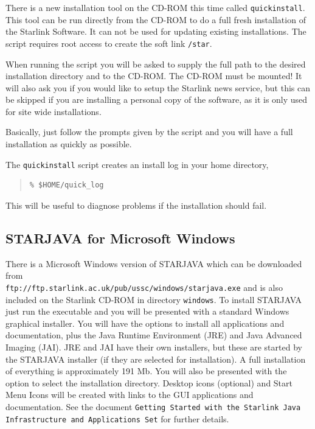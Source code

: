 \documentclass[twoside,11pt]{article}
\newcommand{\htmladdnormallink}[2]{#1}
\newcommand{\xref}[3]{#1}
\newcommand{\xlabel}[1]{}
\renewcommand{\_}{\texttt{\symbol{95}}}
\begin{document}
There is a new installation tool on the CD-ROM this time called \texttt{quick\_install}.
This tool can be run directly from the CD-ROM to do a full fresh installation of
the Starlink Software. It can not be used for updating existing installations.
The script requires root access to create the soft link \texttt{/star}.

When running the script you will be asked to supply the full path to the
desired installation directory and to the CD-ROM. The CD-ROM must be mounted!
It will also ask you if you would like to setup the Starlink news service,
but this can be skipped if you are installing a personal copy of the software,
as it is only used for site wide installations.

Basically, just follow the prompts given by the script and you will have a
full installation as quickly as possible.

The \texttt{quick\_install} script creates an install log in your home directory,

\begin{quote}
\begin{verbatim}
% $HOME/quick_log
\end{verbatim}
\end{quote}

This will be useful to diagnose problems if the installation should fail.

\subsection{\label{windows}\xlabel{windows}STARJAVA for Microsoft Windows}

There is a Microsoft Windows version of STARJAVA which can be downloaded from \\
\htmladdnormallink{\texttt{ftp://ftp.starlink.ac.uk/pub/ussc/windows/starjava.exe}}{ftp://ftp.starlink.ac.uk/pub/ussc/windows/starjava.exe}
and is also included on the Starlink CD-ROM in directory \texttt{windows}.
To install STARJAVA just run the executable and you will be presented with a standard
Windows graphical installer. You will have the options to install all applications and
documentation, plus the Java Runtime Environment (JRE) and Java Advanced Imaging (JAI).
JRE and JAI have their own installers, but these are started by the STARJAVA installer
(if they are selected for installation). A full installation of everything is approximately
191 Mb. You will also be presented with the option to select the installation directory.
Desktop icons (optional) and Start Menu Icons will be created with links to the
GUI applications and documentation. See the document \xref{}{sun251}{}
\texttt{Getting Started with the Starlink Java Infrastructure and Applications Set}
for further details.
\end{document}
